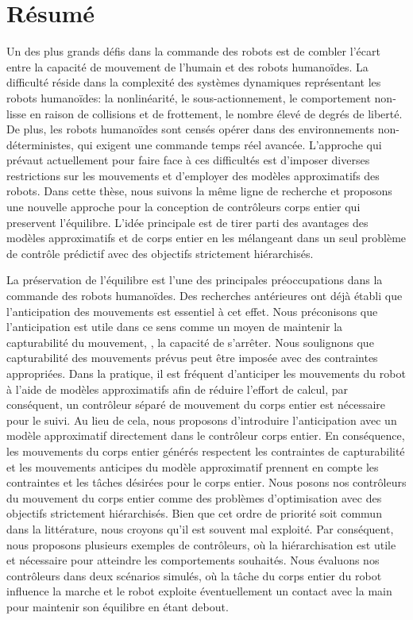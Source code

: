 \clearpage
{}
{}
\chapter*{Résumé}

Un des plus grands défis dans la commande des robots est de combler l'écart
entre la capacité de mouvement de l'humain et des robots humanoïdes. La
difficulté réside dans la complexité des systèmes dynamiques représentant les
robots humanoïdes: la nonlinéarité, le sous-actionnement, le comportement
non-lisse en raison de collisions et de frottement, le nombre élevé de degrés
de liberté. De plus, les robots humanoïdes sont censés opérer dans des
environnements non-déterministes, qui exigent une commande temps réel avancée.
L'approche qui prévaut actuellement pour faire face à ces difficultés est
d'imposer diverses restrictions sur les mouvements et d'employer des modèles
approximatifs des robots. Dans cette thèse, nous suivons la même ligne de
recherche et proposons une nouvelle approche pour la conception de contrôleurs
corps entier qui preservent l'équilibre. L'idée principale est de tirer parti
des avantages des modèles approximatifs et de corps entier en les mélangeant
dans un seul problème de contrôle prédictif avec des objectifs strictement
hiérarchisés.


La préservation de l'équilibre est l'une des principales préoccupations dans la
commande des robots humanoïdes. Des recherches antérieures ont déjà établi que
l'anticipation des mouvements est essentiel à cet effet. Nous préconisons que
l'anticipation est utile dans ce sens comme un moyen de maintenir la
capturabilité du mouvement, \IE, la capacité de s'arrêter. Nous soulignons que
capturabilité des mouvements prévus peut être imposée avec des contraintes
appropriées. Dans la pratique, il est fréquent d'anticiper les mouvements du
robot à l'aide de modèles approximatifs afin de réduire l'effort de calcul, par
conséquent, un contrôleur séparé de mouvement du corps entier est nécessaire
pour le suivi. Au lieu de cela, nous proposons d'introduire l'anticipation avec
un modèle approximatif directement dans le contrôleur corps entier. En
conséquence, les mouvements du corps entier générés respectent les contraintes
de capturabilité et les mouvements anticipes du modèle approximatif prennent en
compte les contraintes et les tâches désirées pour le corps entier. Nous posons
nos contrôleurs du mouvement du corps entier comme des problèmes d'optimisation
avec des objectifs strictement hiérarchisés. Bien que cet ordre de priorité
soit commun dans la littérature, nous croyons qu'il est souvent mal exploité.
Par conséquent, nous proposons plusieurs exemples de contrôleurs, où la
hiérarchisation est utile et nécessaire pour atteindre les comportements
souhaités. Nous évaluons nos contrôleurs dans deux scénarios simulés, où la
tâche du corps entier du robot influence la marche et le robot exploite
éventuellement un contact avec la main pour maintenir son équilibre en étant
debout.


